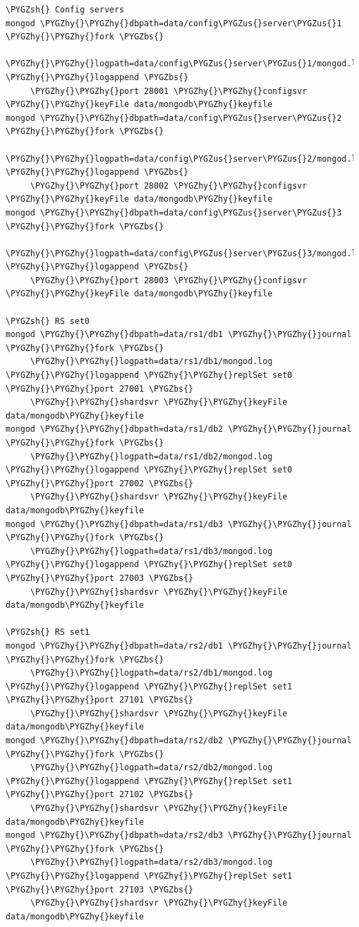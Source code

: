 \documentclass[a4paper,10pt,english]{sphinxmanual}
\def\PYGZbs{\char`\\}
\def\PYGZus{\char`\_}
\def\PYGZsh{\char`\#}
\def\PYGZhy{\char`\-}
\begin{document}
\begin{Verbatim}[commandchars=\\\{\}]
\PYGZsh{} Config servers
mongod \PYGZhy{}\PYGZhy{}dbpath=data/config\PYGZus{}server\PYGZus{}1 \PYGZhy{}\PYGZhy{}fork \PYGZbs{}
     \PYGZhy{}\PYGZhy{}logpath=data/config\PYGZus{}server\PYGZus{}1/mongod.log \PYGZhy{}\PYGZhy{}logappend \PYGZbs{}
     \PYGZhy{}\PYGZhy{}port 28001 \PYGZhy{}\PYGZhy{}configsvr \PYGZhy{}\PYGZhy{}keyFile data/mongodb\PYGZhy{}keyfile
mongod \PYGZhy{}\PYGZhy{}dbpath=data/config\PYGZus{}server\PYGZus{}2 \PYGZhy{}\PYGZhy{}fork \PYGZbs{}
     \PYGZhy{}\PYGZhy{}logpath=data/config\PYGZus{}server\PYGZus{}2/mongod.log \PYGZhy{}\PYGZhy{}logappend \PYGZbs{}
     \PYGZhy{}\PYGZhy{}port 28002 \PYGZhy{}\PYGZhy{}configsvr \PYGZhy{}\PYGZhy{}keyFile data/mongodb\PYGZhy{}keyfile
mongod \PYGZhy{}\PYGZhy{}dbpath=data/config\PYGZus{}server\PYGZus{}3 \PYGZhy{}\PYGZhy{}fork \PYGZbs{}
     \PYGZhy{}\PYGZhy{}logpath=data/config\PYGZus{}server\PYGZus{}3/mongod.log \PYGZhy{}\PYGZhy{}logappend \PYGZbs{}
     \PYGZhy{}\PYGZhy{}port 28003 \PYGZhy{}\PYGZhy{}configsvr \PYGZhy{}\PYGZhy{}keyFile data/mongodb\PYGZhy{}keyfile

\PYGZsh{} RS set0
mongod \PYGZhy{}\PYGZhy{}dbpath=data/rs1/db1 \PYGZhy{}\PYGZhy{}journal \PYGZhy{}\PYGZhy{}fork \PYGZbs{}
     \PYGZhy{}\PYGZhy{}logpath=data/rs1/db1/mongod.log \PYGZhy{}\PYGZhy{}logappend \PYGZhy{}\PYGZhy{}replSet set0 \PYGZhy{}\PYGZhy{}port 27001 \PYGZbs{}
     \PYGZhy{}\PYGZhy{}shardsvr \PYGZhy{}\PYGZhy{}keyFile data/mongodb\PYGZhy{}keyfile
mongod \PYGZhy{}\PYGZhy{}dbpath=data/rs1/db2 \PYGZhy{}\PYGZhy{}journal \PYGZhy{}\PYGZhy{}fork \PYGZbs{}
     \PYGZhy{}\PYGZhy{}logpath=data/rs1/db2/mongod.log \PYGZhy{}\PYGZhy{}logappend \PYGZhy{}\PYGZhy{}replSet set0 \PYGZhy{}\PYGZhy{}port 27002 \PYGZbs{}
     \PYGZhy{}\PYGZhy{}shardsvr \PYGZhy{}\PYGZhy{}keyFile data/mongodb\PYGZhy{}keyfile
mongod \PYGZhy{}\PYGZhy{}dbpath=data/rs1/db3 \PYGZhy{}\PYGZhy{}journal \PYGZhy{}\PYGZhy{}fork \PYGZbs{}
     \PYGZhy{}\PYGZhy{}logpath=data/rs1/db3/mongod.log \PYGZhy{}\PYGZhy{}logappend \PYGZhy{}\PYGZhy{}replSet set0 \PYGZhy{}\PYGZhy{}port 27003 \PYGZbs{}
     \PYGZhy{}\PYGZhy{}shardsvr \PYGZhy{}\PYGZhy{}keyFile data/mongodb\PYGZhy{}keyfile

\PYGZsh{} RS set1
mongod \PYGZhy{}\PYGZhy{}dbpath=data/rs2/db1 \PYGZhy{}\PYGZhy{}journal \PYGZhy{}\PYGZhy{}fork \PYGZbs{}
     \PYGZhy{}\PYGZhy{}logpath=data/rs2/db1/mongod.log \PYGZhy{}\PYGZhy{}logappend \PYGZhy{}\PYGZhy{}replSet set1 \PYGZhy{}\PYGZhy{}port 27101 \PYGZbs{}
     \PYGZhy{}\PYGZhy{}shardsvr \PYGZhy{}\PYGZhy{}keyFile data/mongodb\PYGZhy{}keyfile
mongod \PYGZhy{}\PYGZhy{}dbpath=data/rs2/db2 \PYGZhy{}\PYGZhy{}journal \PYGZhy{}\PYGZhy{}fork \PYGZbs{}
     \PYGZhy{}\PYGZhy{}logpath=data/rs2/db2/mongod.log \PYGZhy{}\PYGZhy{}logappend \PYGZhy{}\PYGZhy{}replSet set1 \PYGZhy{}\PYGZhy{}port 27102 \PYGZbs{}
     \PYGZhy{}\PYGZhy{}shardsvr \PYGZhy{}\PYGZhy{}keyFile data/mongodb\PYGZhy{}keyfile
mongod \PYGZhy{}\PYGZhy{}dbpath=data/rs2/db3 \PYGZhy{}\PYGZhy{}journal \PYGZhy{}\PYGZhy{}fork \PYGZbs{}
     \PYGZhy{}\PYGZhy{}logpath=data/rs2/db3/mongod.log \PYGZhy{}\PYGZhy{}logappend \PYGZhy{}\PYGZhy{}replSet set1 \PYGZhy{}\PYGZhy{}port 27103 \PYGZbs{}
     \PYGZhy{}\PYGZhy{}shardsvr \PYGZhy{}\PYGZhy{}keyFile data/mongodb\PYGZhy{}keyfile


\end{Verbatim}
\end{document}
